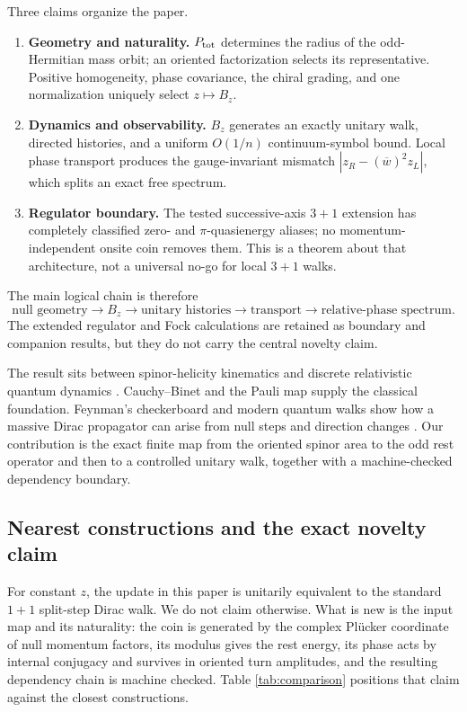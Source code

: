 \documentclass[11pt]{article}
\begin{document}
Three claims organize the paper.
\begin{enumerate}[leftmargin=2em]
  \item \textbf{Geometry and naturality.}  $P_{\rm tot}$ determines the radius
  of the odd-Hermitian mass orbit; an oriented factorization selects its
  representative.  Positive homogeneity, phase covariance, the chiral grading,
  and one normalization uniquely select $z\mapsto B_z$.
  \item \textbf{Dynamics and observability.}  $B_z$ generates an exactly
  unitary walk, directed histories, and a uniform $O(1/n)$ continuum-symbol
  bound.  Local phase transport produces the gauge-invariant mismatch
  $|z_R-(\overline w)^2z_L|$, which splits an exact free spectrum.
  \item \textbf{Regulator boundary.}  The tested successive-axis $3+1$
  extension has completely classified zero- and $\pi$-quasienergy aliases;
  no momentum-independent onsite coin removes them.  This is a theorem about
  that architecture, not a universal no-go for local $3+1$ walks.
\end{enumerate}

The main logical chain is therefore
\[
 \text{null geometry}\longrightarrow B_z\longrightarrow
 \text{unitary histories}\longrightarrow\text{transport}\longrightarrow
 \text{relative-phase spectrum}.
\]
The extended regulator and Fock calculations are retained as boundary and
companion results, but they do not carry the central novelty claim.

The result sits between spinor-helicity kinematics and discrete relativistic
quantum dynamics \cite{ElvangHuang,ArkaniHamedMassive}.  Cauchy--Binet and the
Pauli map supply the classical foundation.  Feynman's checkerboard and modern
quantum walks show how a massive Dirac propagator can arise from null steps and
direction changes
\cite{FeynmanHibbs,JacobsonSchulman,BisioDarianoTosini,DarianoPathIntegral,MlodinowBrun}.
Our contribution is the exact finite map from the oriented spinor area to the
odd rest operator and then to a controlled unitary walk, together with a
machine-checked dependency boundary.

\subsection*{Nearest constructions and the exact novelty claim}

For constant $z$, the update in this paper is unitarily equivalent to the
standard $1+1$ split-step Dirac walk.  We do not claim otherwise.  What is new
is the input map and its naturality: the coin is generated by the complex
Pl\"ucker coordinate of null momentum factors, its modulus gives the rest
energy, its phase acts by internal conjugacy and survives in oriented turn
amplitudes, and the resulting dependency chain is machine checked.  Table
\ref{tab:comparison} positions that claim against the closest constructions.
\end{document}
